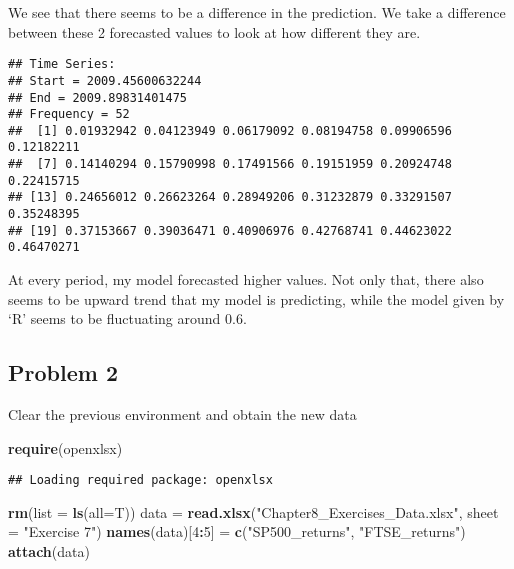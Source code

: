 \documentclass[]{article}
\newenvironment{Shaded}{\begin{snugshade}}{\end{snugshade}}
\newcommand{\KeywordTok}[1]{\textcolor[rgb]{0.13,0.29,0.53}{\textbf{#1}}}
\newcommand{\DataTypeTok}[1]{\textcolor[rgb]{0.13,0.29,0.53}{#1}}
\newcommand{\DecValTok}[1]{\textcolor[rgb]{0.00,0.00,0.81}{#1}}
\newcommand{\StringTok}[1]{\textcolor[rgb]{0.31,0.60,0.02}{#1}}
\newcommand{\OperatorTok}[1]{\textcolor[rgb]{0.81,0.36,0.00}{\textbf{#1}}}
\newcommand{\NormalTok}[1]{#1}
\begin{document}
We see that there seems to be a difference in the prediction. We take a
difference between these 2 forecasted values to look at how different
they are.

\begin{Shaded}
\end{Shaded}

\begin{verbatim}
## Time Series:
## Start = 2009.45600632244 
## End = 2009.89831401475 
## Frequency = 52 
##  [1] 0.01932942 0.04123949 0.06179092 0.08194758 0.09906596 0.12182211
##  [7] 0.14140294 0.15790998 0.17491566 0.19151959 0.20924748 0.22415715
## [13] 0.24656012 0.26623264 0.28949206 0.31232879 0.33291507 0.35248395
## [19] 0.37153667 0.39036471 0.40906976 0.42768741 0.44623022 0.46470271
\end{verbatim}

At every period, my model forecasted higher values. Not only that, there
also seems to be upward trend that my model is predicting, while the
model given by `R' seems to be fluctuating around 0.6.

\subsection{Problem 2}\label{problem-2}

Clear the previous environment and obtain the new data

\begin{Shaded}
\begin{Highlighting}[]
\KeywordTok{require}\NormalTok{(openxlsx)}
\end{Highlighting}
\end{Shaded}

\begin{verbatim}
## Loading required package: openxlsx
\end{verbatim}

\begin{Shaded}
\begin{Highlighting}[]
\KeywordTok{rm}\NormalTok{(}\DataTypeTok{list =} \KeywordTok{ls}\NormalTok{(}\DataTypeTok{all=}\NormalTok{T))}
\NormalTok{data =}\StringTok{ }\KeywordTok{read.xlsx}\NormalTok{(}\StringTok{"Chapter8_Exercises_Data.xlsx"}\NormalTok{, }\DataTypeTok{sheet =} \StringTok{"Exercise 7"}\NormalTok{)}
\KeywordTok{names}\NormalTok{(data)[}\DecValTok{4}\OperatorTok{:}\DecValTok{5}\NormalTok{] =}\StringTok{ }\KeywordTok{c}\NormalTok{(}\StringTok{"SP500_returns"}\NormalTok{, }\StringTok{"FTSE_returns"}\NormalTok{)}
\KeywordTok{attach}\NormalTok{(data)}
\end{Highlighting}
\end{Shaded}
\end{document}
